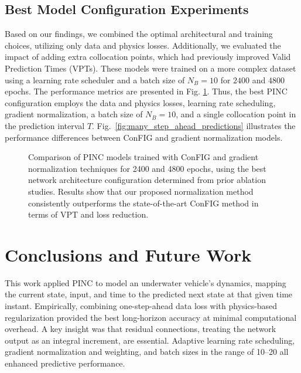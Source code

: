 \subsection{Best Model Configuration Experiments}
\label{subsec:best_confs}
%
Based on our findings, we combined the optimal architectural and training choices, utilizing only data and physics losses. Additionally, we evaluated the impact of adding extra collocation points, which had previously improved Valid Prediction Times (VPTs).
These models were trained on a more complex dataset using a learning rate scheduler and a batch size of $N_B=10$ for $2400$ and $4800$ epochs. The performance metrics are presented in Fig. \ref{fig:final_results}. 
Thus, the best PINC configuration employs the data and physics losses, learning rate scheduling, gradient normalization, a batch size of $N_B=10$, and a single collocation point in the prediction interval $T$.
Fig.~\ref{fig:many_step_ahead_predictions} illustrates the performance differences between ConFIG and gradient normalization models.

\begin{figure}[t]

    \caption{Comparison of PINC models trained with ConFIG and gradient normalization techniques for 2400 and 4800 epochs, using the best network architecture configuration determined from prior ablation studies. Results show that our proposed normalization method consistently outperforms the state-of-the-art ConFIG method in terms of VPT and loss reduction.}
    \label{fig:final_results}
\end{figure}






\section{Conclusions and Future Work} %
\label{sec:conclusions}
This work applied PINC to model an underwater vehicle's dynamics, mapping the current state, input, and time to the predicted next state at that given time instant. Empirically, combining one-step-ahead data loss with physics-based regularization provided the best long-horizon accuracy at minimal computational overhead. A key insight was that residual connections, treating the network output as an integral increment, are essential. Adaptive learning rate scheduling, gradient normalization and weighting, and batch sizes in the range of 10–20 all enhanced predictive performance.


